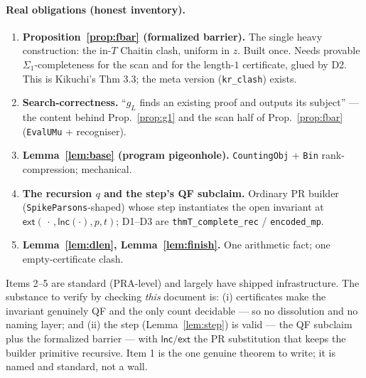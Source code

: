 \documentclass[11pt]{article}
\theoremstyle{plain}
\theoremstyle{definition}
\theoremstyle{remark}
\newcommand{\ext}{\mathsf{ext}}
\newcommand{\lnc}{\mathsf{lnc}}
\begin{document}
\paragraph{Real obligations (honest inventory).}
\begin{enumerate}
\item \textbf{Proposition~\ref{prop:fbar} (formalized barrier).} The single heavy
  construction: the in-$T$ Chaitin clash, uniform in $z$. Built once. Needs provable
  $\Sigma_1$-completeness for the scan and for the length-$1$ certificate, glued by
  D2. This is Kikuchi's Thm 3.3; the meta version (\texttt{kr\_clash}) exists.
\item \textbf{Search-correctness.} ``$g_L$ finds an existing proof and outputs its
  subject'' --- the content behind Prop.~\ref{prop:g1} and the scan half of
  Prop.~\ref{prop:fbar} (\texttt{EvalUMu} + recogniser).
\item \textbf{Lemma~\ref{lem:base} (program pigeonhole).} \texttt{CountingObj} +
  \texttt{Bin} rank-compression; mechanical.
\item \textbf{The recursion $q$ and the step's QF subclaim.} Ordinary PR builder
  (\texttt{SpikeParsons}-shaped) whose step instantiates the open invariant at
  $\ext(\,\cdot\,,\lnc(\cdot),p,t)$; D1--D3 are \texttt{thmT\_complete\_rec} /
  \texttt{encoded\_mp}.
\item \textbf{Lemma~\ref{lem:dlen}, Lemma~\ref{lem:finish}.} One arithmetic fact;
  one empty-certificate clash.
\end{enumerate}

Items 2--5 are standard (PRA-level) and largely have shipped infrastructure. The
substance to verify by checking \emph{this} document is: (i) certificates make the
invariant genuinely QF and the only count decidable --- so no dissolution and no
naming layer; and (ii) the step (Lemma~\ref{lem:step}) is valid --- the QF subclaim
plus the formalized barrier --- with $\lnc/\ext$ the PR substitution that keeps the
builder primitive recursive. Item 1 is the one genuine theorem to write; it is named
and standard, not a wall.
\end{document}
